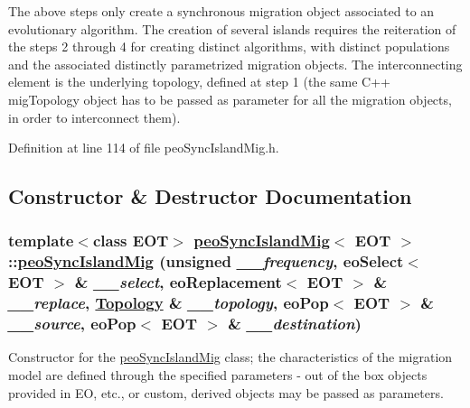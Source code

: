 The above steps only create a synchronous migration object associated to an evolutionary algorithm. The creation of several islands requires the reiteration of the steps 2 through 4 for creating distinct algorithms, with distinct populations and the associated distinctly parametrized migration objects. The interconnecting element is the underlying topology, defined at step 1 (the same C++ mig\-Topology object has to be passed as parameter for all the migration objects, in order to interconnect them). 



Definition at line 114 of file peo\-Sync\-Island\-Mig.h.

\subsection{Constructor \& Destructor Documentation}
\hypertarget{classpeoSyncIslandMig_96b7b6de20b5e318a8b1cde76842305c}{
\subsubsection[peoSyncIslandMig]{\setlength{\rightskip}{0pt plus 5cm}template$<$class EOT$>$ \hyperlink{classpeoSyncIslandMig}{peo\-Sync\-Island\-Mig}$<$ EOT $>$::\hyperlink{classpeoSyncIslandMig}{peo\-Sync\-Island\-Mig} (unsigned {\em \_\-\_\-frequency}, eo\-Select$<$ EOT $>$ \& {\em \_\-\_\-select}, eo\-Replacement$<$ EOT $>$ \& {\em \_\-\_\-replace}, \hyperlink{classTopology}{Topology} \& {\em \_\-\_\-topology}, eo\-Pop$<$ EOT $>$ \& {\em \_\-\_\-source}, eo\-Pop$<$ EOT $>$ \& {\em \_\-\_\-destination})}}
\label{classpeoSyncIslandMig_96b7b6de20b5e318a8b1cde76842305c}


Constructor for the \hyperlink{classpeoSyncIslandMig}{peo\-Sync\-Island\-Mig} class; the characteristics of the migration model are defined through the specified parameters - out of the box objects provided in EO, etc., or custom, derived objects may be passed as parameters. 

